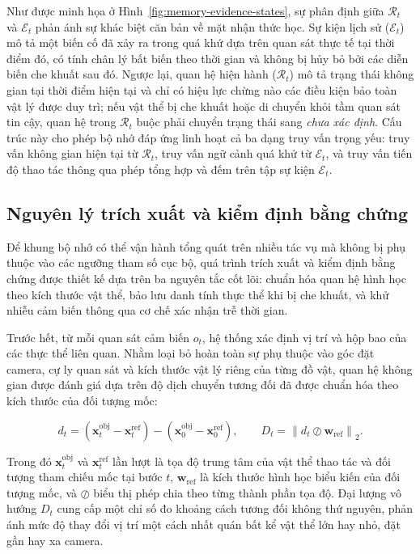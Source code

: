 Như được minh họa ở Hình~\ref{fig:memory-evidence-states}, sự phân định giữa $\mathcal R_t$ và $\mathcal E_t$ phản ánh sự khác biệt căn bản về mặt nhận thức học. Sự kiện lịch sử ($\mathcal E_t$) mô tả một biến cố đã xảy ra trong quá khứ dựa trên quan sát thực tế tại thời điểm đó, có tính chân lý bất biến theo thời gian và không bị hủy bỏ bởi các diễn biến che khuất sau đó. Ngược lại, quan hệ hiện hành ($\mathcal R_t$) mô tả trạng thái không gian tại thời điểm hiện tại và chỉ có hiệu lực chừng nào các điều kiện bảo toàn vật lý được duy trì; nếu vật thể bị che khuất hoặc di chuyển khỏi tầm quan sát tin cậy, quan hệ trong $\mathcal R_t$ buộc phải chuyển trạng thái sang \textit{chưa xác định}. Cấu trúc này cho phép bộ nhớ đáp ứng linh hoạt cả ba dạng truy vấn trọng yếu: truy vấn không gian hiện tại từ $\mathcal R_t$, truy vấn ngữ cảnh quá khứ từ $\mathcal E_t$, và truy vấn tiến độ thao tác thông qua phép tổng hợp và đếm trên tập sự kiện $\mathcal E_t$.

\subsection{Nguyên lý trích xuất và kiểm định bằng chứng}

Để khung bộ nhớ có thể vận hành tổng quát trên nhiều tác vụ mà không bị phụ thuộc vào các ngưỡng tham số cục bộ, quá trình trích xuất và kiểm định bằng chứng được thiết kế dựa trên ba nguyên tắc cốt lõi: chuẩn hóa quan hệ hình học theo kích thước vật thể, bảo lưu danh tính thực thể khi bị che khuất, và khử nhiễu cảm biến thông qua cơ chế xác nhận trễ thời gian.

Trước hết, từ mỗi quan sát cảm biến $o_t$, hệ thống xác định vị trí và hộp bao của các thực thể liên quan. Nhằm loại bỏ hoàn toàn sự phụ thuộc vào góc đặt camera, cự ly quan sát và kích thước vật lý riêng của từng đồ vật, quan hệ không gian được đánh giá dựa trên độ dịch chuyển tương đối đã được chuẩn hóa theo kích thước của đối tượng mốc:

\begin{equation}
d_t = (\mathbf x_t^{\mathrm{obj}} - \mathbf x_t^{\mathrm{ref}}) - (\mathbf x_0^{\mathrm{obj}} - \mathbf x_0^{\mathrm{ref}}),\qquad
D_t = \left\| d_t \oslash \mathbf w_{\mathrm{ref}} \right\|_2.
\label{eq:scale-invariant-distance}
\end{equation}

Trong đó $\mathbf x_t^{\mathrm{obj}}$ và $\mathbf x_t^{\mathrm{ref}}$ lần lượt là tọa độ trung tâm của vật thể thao tác và đối tượng tham chiếu mốc tại bước $t$, $\mathbf w_{\mathrm{ref}}$ là kích thước hình học biểu kiến của đối tượng mốc, và $\oslash$ biểu thị phép chia theo từng thành phần tọa độ. Đại lượng vô hướng $D_t$ cung cấp một chỉ số đo khoảng cách tương đối không thứ nguyên, phản ánh mức độ thay đổi vị trí một cách nhất quán bất kể vật thể lớn hay nhỏ, đặt gần hay xa camera.

